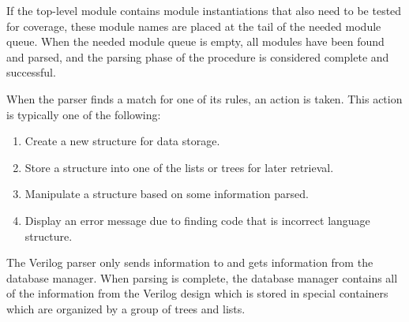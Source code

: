 \begin{Desc}
\item[]If the top-level module contains module instantiations that also need to be tested for coverage, these module names are placed at the tail of the needed module queue. When the needed module queue is empty, all modules have been found and parsed, and the parsing phase of the procedure is considered complete and successful.\end{Desc}
\begin{Desc}
\item[]When the parser finds a match for one of its rules, an action is taken. This action is typically one of the following:\end{Desc}
\begin{Desc}
\item[]\begin{enumerate}
\item Create a new structure for data storage. \item Store a structure into one of the lists or trees for later retrieval. \item Manipulate a structure based on some information parsed. \item Display an error message due to finding code that is incorrect language structure. \end{enumerate}
\end{Desc}
\begin{Desc}
\item[]The Verilog parser only sends information to and gets information from the database manager. When parsing is complete, the database manager contains all of the information from the Verilog design which is stored in special containers which are organized by a group of trees and lists.\end{Desc}





